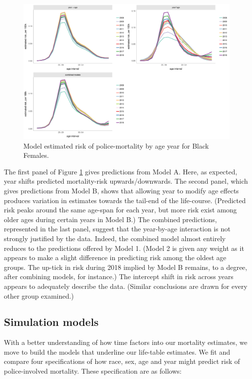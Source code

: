 \documentclass{article}
\begin{document}
\begin{figure}
	\centering
	\includegraphics[width = \linewidth]{vis/fig_a4.pdf}
	\caption{Model estimated risk of police-mortality by age year for Black Females.}
	\label{fig:a4}
\end{figure}

The first panel of Figure \ref{fig:a4} gives predictions from Model A. Here, as expected, year shifts predicted mortality-risk upwards/downwards. The second panel, which gives predictions from Model B, shows that allowing year to modify age effects produces variation in estimates towards the tail-end of the life-course. (Predicted risk peaks around the same age-span for each year, but more risk exist among older ages during certain years in Model B.) The combined predictions, represented in the last panel, suggest that the year-by-age interaction is not strongly justified by the data. Indeed, the combined model almost entirely reduces to the predictions offered by Model 1. (Model 2 is given any weight as it appears to make a slight difference in predicting risk among the oldest age groups. The up-tick in risk during 2018 implied by Model B remains, to a degree, after combining models, for instance.) The intercept shift in risk across years appears to adequately describe the data. (Similar conclusions are drawn for every other group examined.)  

\subsection{Simulation models} 

With a better understanding of how time factors into our mortality estimates, we move to build the models that underline our life-table estimates. We fit and compare four specifications of how race, sex, age and year might predict risk of police-involved mortality. These specification are as follows: 
\end{document}

